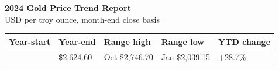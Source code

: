 \documentclass[11pt,a4paper]{article}
\begin{document}
\begin{center}
  {\LARGE\bfseries 2024 Gold Price Trend Report}\\[0.45em]
  {\small\color{muted}USD per troy ounce, month-end close basis}
\end{center}
\vspace{0.35em}

\renewcommand{\arraystretch}{1.35}
\begin{center}
\begin{tabular}{|>{\centering\arraybackslash}p{}
               |>{\centering\arraybackslash}p{}
               |>{\centering\arraybackslash}p{}
               |>{\centering\arraybackslash}p{}
               |>{\centering\arraybackslash}p{}|}
\hline
\rowcolor{headerbg}
{\footnotesize Year-start} &
{\footnotesize Year-end} &
{\footnotesize Range high} &
{\footnotesize Range low} &
{\footnotesize YTD change} \\
\hline
{\small \$2,039.15} &
{\small \$2,624.60} &
{\small Oct \$2,746.70} &
{\small Jan \$2,039.15} &
{\small +28.7\%} \\
\hline
\end{tabular}
\end{center}

\vspace{0.4em}
\end{document}
